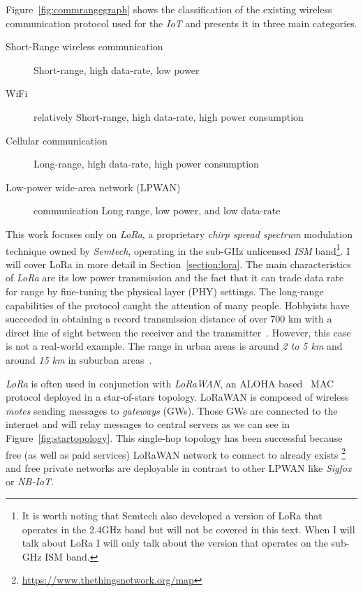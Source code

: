 Figure~\ref{fig:commrangegraph} shows the classification
of the existing wireless communication protocol used for the \emph{IoT} and
presents it in three main categories.

\begin{description}
    \item[Short-Range wireless communication] Short-range, high
        data-rate, low power
    \item[WiFi] relatively Short-range, high
        data-rate, high power consumption
    \item[Cellular communication] Long-range, high data-rate, high power
        consumption
    \item[Low-power wide-area network (LPWAN)] communication Long range,
        low power, and low data-rate
\end{description}



This work focuses only on \emph{LoRa}, a proprietary \emph{chirp spread spectrum}
modulation technique owned by \emph{Semtech}, operating in the sub-GHz
unlicensed \emph{ISM} band\footnote{It is worth noting that Semtech also developed a version of LoRa that
operates in the 2.4GHz band but will not be covered in this text. When I will talk
about LoRa I will only talk about the version that operates on the sub-GHz ISM band.}.
I will cover LoRa in more detail in Section~\ref{section:lora}.
The main characteristics of \emph{LoRa} are its low power transmission and the
fact that it can trade data rate for range by fine-tuning the physical layer
(PHY) settings.
The long-range capabilities of the protocol caught the attention of
many people.
Hobbyists have succeeded in obtaining a record transmission distance of over 700 km with
a direct line of sight between the receiver and the
transmitter~\cite{network_2017}.
However, this case is not a real-world example. The range in urban areas is
around \emph{2 to 5 km} and around \emph{15 km} in suburban
areas~\cite{8030482}.

\emph{LoRa} is often used in conjunction with \emph{LoRaWAN}, an ALOHA
based~\cite{loraalliance:lorawanspecification} MAC protocol deployed in a star-of-stars
topology.
LoRaWAN is composed of wireless \emph{motes} sending messages to \emph{gateways} (GWs).
Those GWs are connected to the internet and will relay messages to central servers
as we can see in Figure~\ref{fig:startopology}.
This single-hop topology has been successful because free (as well as paid
services) LoRaWAN network to connect to already exists
\footnote{\url{https://www.thethingsnetwork.org/map}} and free private networks are
deployable in contrast to other LPWAN like \emph{Sigfox} or \emph{NB-IoT}.

